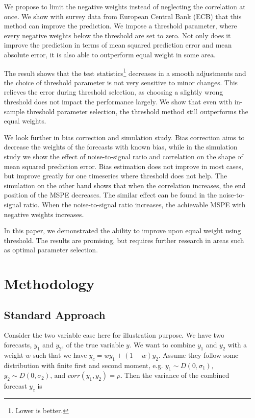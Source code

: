 \documentclass[11pt]{article}
\let\rmarkdownfootnote\footnote%
\def\footnote{\protect\rmarkdownfootnote}
\begin{document}
We propose to limit the negative weights instead of neglecting the correlation at once. We show with survey data from European Central Bank (ECB) that this method can improve the prediction. We impose a threshold parameter, where every negative weights below the threshold are set to zero. Not only does it improve the prediction in terms of mean squared prediction error and mean absolute error, it is also able to outperform equal weight in some area.
 
The result shows that the test statistics\footnote{Lower is better.} decreases in a smooth adjustments and the choice of threshold parameter is not very sensitive to minor changes. This relieves the error during threshold selection, as choosing a slightly wrong threshold does not impact the performance largely. We show that even with in-sample threshold parameter selection, the threshold method still outperforms the equal weights.

We look further in bias correction and simulation study. Bias correction aims to decrease the weights of the forecasts with known bias, while in the simulation study we show the effect of noise-to-signal ratio and correlation on the shape of mean squared prediction error. Bias estimation does not improve in most cases, but improve greatly for one timeseries where threshold does not help. The simulation on the other hand shows that when the correlation increases, the end position of the MSPE decreases. The similar effect can be found in the noise-to-signal ratio. When the noise-to-signal ratio increases, the achievable MSPE with negative weights increases.

In this paper, we demonstrated the ability to improve upon equal weight using threshold. The results are promising, but requires further research in areas such as optimal parameter selection.


\section{Methodology}\label{methodology}

\subsection{Standard Approach}\label{standard-approach}

Consider the two variable case here for illustration purpose. We have
two forecasts, \(y_1\) and \(y_2\), of the true variable \(y\). We want
to combine \(y_1\) and \(y_2\) with a weight \(w\) such that we have
\(y_c = w y_1 + (1-w) y_2\). Assume they follow some distribution with finite first and second moment, e.g.
\(y_1 \sim D(0,\sigma_1)\), \(y_2 \sim D(0,\sigma_2)\), and
\(corr(y_1,y_2)=\rho\). Then the variance of the combined forecast
\(y_c\) is
\end{document}
